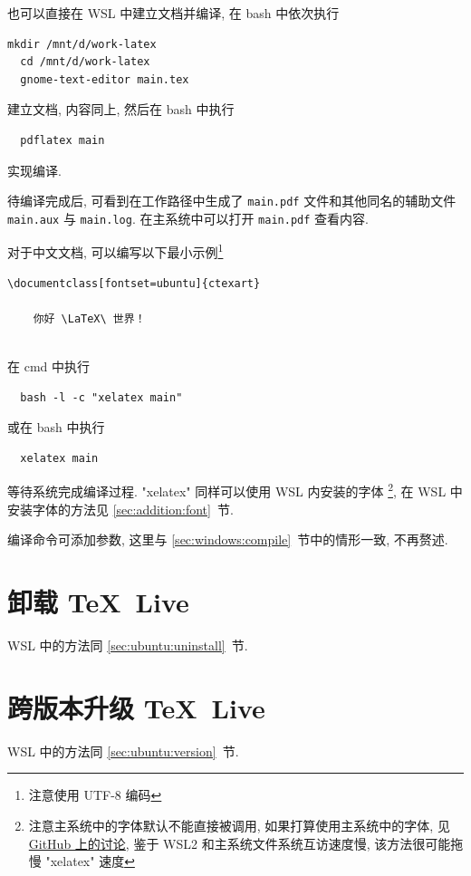 也可以直接在 WSL 中建立文档并编译,
在 \textsf{bash} 中依次执行
\begin{lstlisting}[deletekeywords = tex]
  mkdir /mnt/d/work-latex
  cd /mnt/d/work-latex
  gnome-text-editor main.tex
\end{lstlisting}
建立文档,
内容同上,
然后在 \textsf{bash} 中执行
\begin{lstlisting}
  pdflatex main
\end{lstlisting}
实现编译.

待编译完成后, 可看到在工作路径中生成了 \texttt{main.pdf}
文件和其他同名的辅助文件 \texttt{main.aux} 与 \texttt{main.log}.
在主系统中可以打开 \texttt{main.pdf} 查看内容.

对于中文文档,
可以编写以下最小示例\footnote{注意使用 UTF-8 编码}%
\begin{lstlisting}[language = mwe]
  \documentclass[fontset=ubuntu]{ctexart}
  
    你好 \LaTeX\ 世界！
  
\end{lstlisting}
在 \textsf{cmd} 中执行
\begin{lstlisting}
  bash -l -c "xelatex main"
\end{lstlisting}
或在 \textsf{bash} 中执行
\begin{lstlisting}
  xelatex main
\end{lstlisting}
等待系统完成编译过程.
"xelatex" 同样可以使用 WSL 内安装的字体%
\footnote{注意主系统中的字体默认不能直接被调用,
如果打算使用主系统中的字体,
见
\href{https://github.com/OsbertWang/install-latex-guide-zh-cn/issues/14}{GitHub 上的讨论},
鉴于 WSL2 和主系统文件系统互访速度慢,
该方法很可能拖慢 "xelatex" 速度},
在 WSL 中安装字体的方法见 \ref{sec:addition:font}~节.

编译命令可添加参数, 这里与 \ref{sec:windows:compile}~节中的情形一致, 不再赘述.

\section{卸载 \TeX~Live}

WSL 中的方法同 \ref{sec:ubuntu:uninstall}~节.

\section{跨版本升级 \TeX~Live}

WSL 中的方法同 \ref{sec:ubuntu:version}~节.
